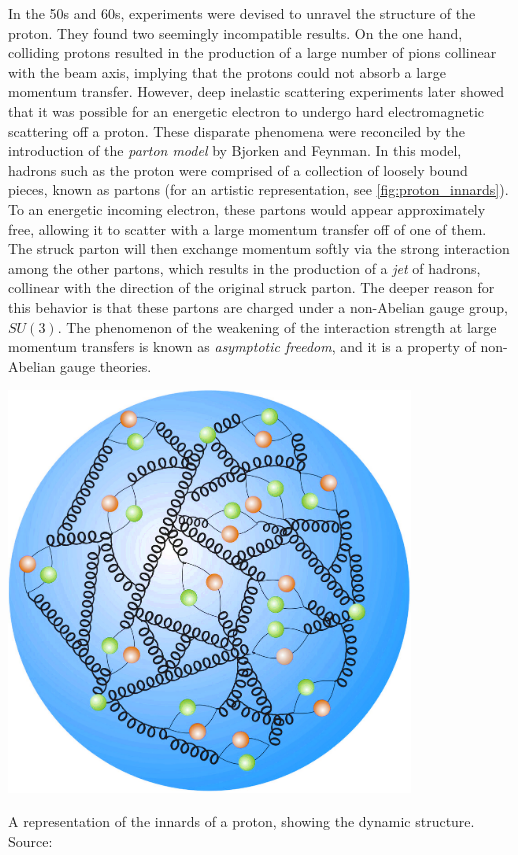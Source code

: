 In the 50s and 60s, experiments were devised to unravel the structure of the proton. They found two seemingly incompatible results. On the one hand, colliding protons resulted in the production of a large number of pions collinear with the beam axis, implying that the protons could not absorb a large momentum transfer. However, deep inelastic scattering experiments later showed that it was possible for an energetic electron to undergo hard electromagnetic scattering off a proton. These disparate phenomena were reconciled by the introduction of the \emph{parton model} by Bjorken and Feynman. In this model, hadrons such as the proton were comprised of a collection of loosely bound pieces, known as partons (for an artistic representation, see \autoref{fig:proton_innards}). To an energetic incoming electron, these partons would appear approximately free, allowing it to scatter with a large momentum transfer off of one of them. The struck parton will then exchange momentum softly via the strong interaction among the other partons, which results in the production of a \emph{jet} of hadrons, collinear with the direction of the original struck parton. The deeper reason for this behavior is that these partons are charged under a non-Abelian gauge group, $SU(3)$. The phenomenon of the weakening of the interaction strength at large momentum transfers is known as \emph{asymptotic freedom}, and it is a property of non-Abelian gauge theories.
\begin{marginfigure}[-3in]
  \strictpagecheck
  \includegraphics[width=0.8\textwidth]{images/proton_innards}
\caption{A representation of the innards of a proton, showing the dynamic structure. Source: \citep{proton_structure}}
\label{fig:proton_innards}
\end{marginfigure}
